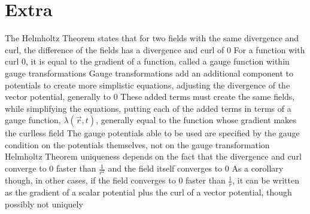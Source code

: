\documentclass[11 pt, twoside]{article}
\newenvironment{outline*}
{
	\begin{outline}[enumerate]
	}
	{\end{outline}
}
\begin{document}
\section{Extra}
\begin{outline*}
\1 The Helmholtz Theorem states that for two fields with the same divergence and curl, the difference of the fields has a divergence and curl of 0
	\2 For a function with curl 0, it is equal to the gradient of a function, called a gauge function within gauge transformations
\1 Gauge transformations add an additional component to potentials to create more simplistic equations, adjusting the divergence of the vector potential, generally to 0
	\2 These added terms must create the same fields, while simplifying the equations, putting each of the added terms in terms of a gauge function, $\lambda(\vec{r}, t)$, generally equal to the function whose gradient makes the curlless field
	\2 The gauge potentials able to be used are specified by the gauge condition on the potentials themselves, not on the gauge transformation
\1 Helmholtz Theorem uniqueness depends on the fact that the divergence and curl converge to 0 faster than $\frac{1}{r^2}$ and the field itself converges to 0
	\2 As a corollary though, in other cases, if the field converges to 0 faster than $\frac{1}{r}$, it can be written as the gradient of a scalar potential plus the curl of a vector potential, though possibly not uniquely
\end{outline*}
\end{document}
